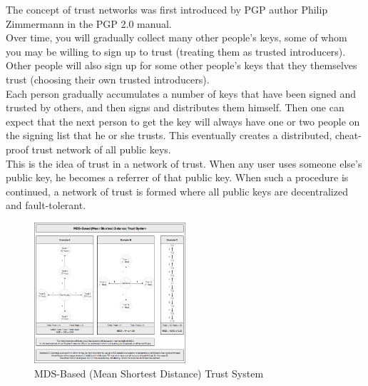 The concept of trust networks was first introduced by PGP author Philip Zimmermann in 
the PGP 2.0 manual\cite{b7}.
\\
Over time, you will gradually collect many other people's keys, some of whom you may 
be willing to sign up to trust (treating them as trusted introducers). Other people 
will also sign up for some other people's keys that they themselves trust (choosing 
their own trusted introducers).
\\
Each person gradually accumulates a number of keys that have been signed and trusted 
by others, and then signs and distributes them himself. Then one can expect that the 
next person to get the key will always have one or two people on the signing list that 
he or she trusts. This eventually creates a distributed, cheat-proof trust network of 
all public keys.
\\
This is the idea of trust in a network of trust. When any user uses someone else's 
public key, he becomes a referrer of that public key. When such a procedure is 
continued, a network of trust is formed where all public keys are decentralized 
and fault-tolerant.

\begin{figure}[H] %
    \centering %
    \includegraphics[width=0.5\textwidth]{figures/trustSystem.png} %
    \caption{MDS-Based (Mean Shortest Distance) Trust System} %
    \label{Fig.2: MDS-Based (Mean Shortest Distance) Trust System} %
\end{figure}

